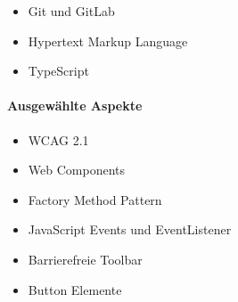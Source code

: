 \begin{itemize}
	\item Git und GitLab
	\item Hypertext Markup Language
	\item TypeScript
\end{itemize}

\paragraph{Ausgewählte Aspekte}

\begin{itemize}
	\item WCAG 2.1
	\item Web Components
	\item Factory Method Pattern
	\item JavaScript Events und EventListener
	\item Barrierefreie Toolbar
	\item Button Elemente
\end{itemize}
